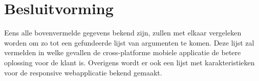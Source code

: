 \section{Besluitvorming}
Eens alle bovenvermelde gegevens bekend zijn, zullen met elkaar vergeleken worden om zo tot een gefundeerde lijst van argumenten
te komen. Deze lijst zal vermelden in welke gevallen de cross-platforme mobiele applicatie de betere oplossing voor de klant is.
Overigens wordt er ook een lijst met karakteristieken voor de responsive webapplicatie bekend gemaakt.

